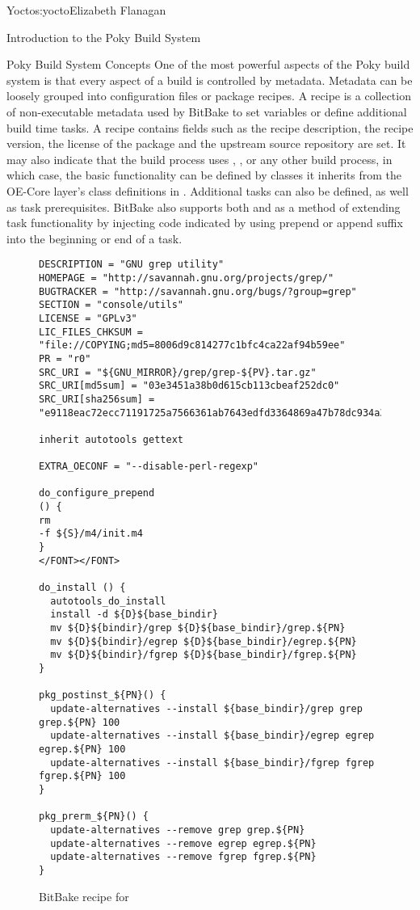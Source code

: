 \begin{aosachapter}{Yocto}{s:yocto}{Elizabeth Flanagan}
\begin{aosasect1}{Introduction to the Poky Build System}
\begin{aosasect2}{Poky Build System Concepts}
One of the most powerful aspects of the
Poky build system is that every aspect of a build is controlled by
metadata. Metadata can be loosely grouped into configuration files or
package recipes. A recipe is a
collection of non-executable
metadata used by BitBake to set variables or define additional build
time tasks. A recipe contains fields such as the recipe description,
the recipe version, the license of the package and the upstream
source repository are set. It may also indicate
that the build process uses , ,  or any
other build process, in which case, the basic functionality can be
defined by classes it inherits from
the OE-Core layer's class definitions in .
Additional tasks can also be
defined, as well as task prerequisites. BitBake
also supports both 
and  as a method of extending task functionality by injecting
code indicated by using prepend or append suffix into the beginning
or end of a task.

\begin{figure}
\begin{verbatim}
DESCRIPTION = "GNU grep utility"
HOMEPAGE = "http://savannah.gnu.org/projects/grep/"
BUGTRACKER = "http://savannah.gnu.org/bugs/?group=grep"
SECTION = "console/utils"
LICENSE = "GPLv3"
LIC_FILES_CHKSUM = "file://COPYING;md5=8006d9c814277c1bfc4ca22af94b59ee"
PR = "r0"
SRC_URI = "${GNU_MIRROR}/grep/grep-${PV}.tar.gz"
SRC_URI[md5sum] = "03e3451a38b0d615cb113cbeaf252dc0"
SRC_URI[sha256sum] = "e9118eac72ecc71191725a7566361ab7643edfd3364869a47b78dc934a357970"

inherit autotools gettext

EXTRA_OECONF = "--disable-perl-regexp"

do_configure_prepend
() {
rm
-f ${S}/m4/init.m4
}
</FONT></FONT>

do_install () {
  autotools_do_install
  install -d ${D}${base_bindir}
  mv ${D}${bindir}/grep ${D}${base_bindir}/grep.${PN}
  mv ${D}${bindir}/egrep ${D}${base_bindir}/egrep.${PN}
  mv ${D}${bindir}/fgrep ${D}${base_bindir}/fgrep.${PN}
}

pkg_postinst_${PN}() {
  update-alternatives --install ${base_bindir}/grep grep grep.${PN} 100
  update-alternatives --install ${base_bindir}/egrep egrep egrep.${PN} 100
  update-alternatives --install ${base_bindir}/fgrep fgrep fgrep.${PN} 100
}

pkg_prerm_${PN}() {
  update-alternatives --remove grep grep.${PN}
  update-alternatives --remove egrep egrep.${PN}
  update-alternatives --remove fgrep fgrep.${PN}
}
\end{verbatim}
\caption{BitBake recipe for }
\label{fig.yocto.recipe}
\end{figure}


\end{aosasect2}
\end{aosasect1}
\end{aosachapter}
